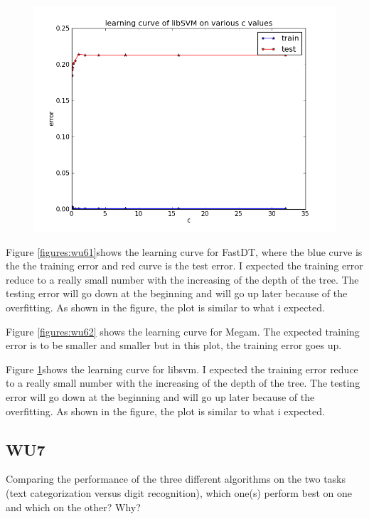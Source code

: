 \documentclass[a4paper,11pt]{article}
\begin{document}
\begin{figure}[!ht]
  \begin{center}
  \includegraphics[width=4.5in]{WU6/learningCurve_libsvm.png}
    \label{figures:wu63}
  \end{center}
\end{figure}

Figure \ref{figures:wu61}shows the learning curve for FastDT, where the blue curve is the the training error and red curve is the test error. I expected the training error reduce to a really small number with the increasing of the depth of the tree. The testing error will go down at the beginning and will go up later because of the overfitting. As shown in the figure, the plot is similar to what i expected.

Figure  \ref{figures:wu62} shows the learning curve for Megam. The expected training error is to be smaller and smaller but in this plot, the training error goes up. 

Figure \ref{figures:wu63}shows the learning curve for libsvm.  I expected the training error reduce to a really small number with the increasing of the depth of the tree. The testing error will go down at the beginning and will go up later because of the overfitting. As shown in the figure, the plot is similar to what i expected.


\subsection{WU7}
\textsf{Comparing the performance of the three different algorithms 
on the two tasks (text categorization versus digit recognition), 
which one(s) perform best on one and which on the other? Why?}\\
\end{document}

